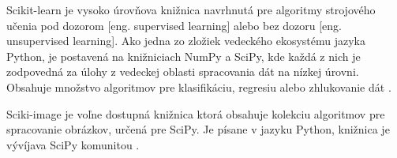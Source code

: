 Scikit-learn je vysoko úrovňova knižnica navrhnutá pre algoritmy strojového učenia pod dozorom [eng. supervised learning] alebo bez dozoru [eng. unsupervised learning].
Ako jedna zo zložiek vedeckého ekosystému jazyka Python, je postavená na knižniciach NumPy a SciPy, kde každá z nich je zodpovedná za úlohy z vedeckej oblasti spracovania dát na nízkej úrovni.
Obsahuje množstvo algoritmov pre klasifikáciu, regresiu alebo zhlukovanie dát \cite{odkaz:FrameworkComparison3}.

Sciki-image je voľne dostupná knižnica ktorá obsahuje kolekciu algoritmov pre spracovanie obrázkov, určená pre SciPy.
Je písane v jazyku Python, knižnica je vývíjava SciPy komunitou \cite{prop:scikit-image}.
